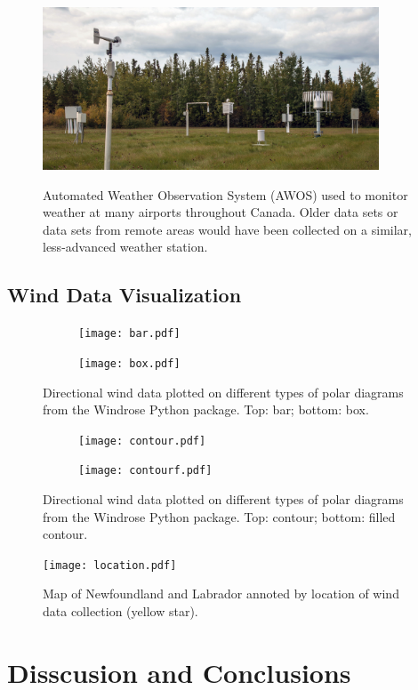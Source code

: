 \documentclass{article}
\begin{document}
\begin{figure}[h!]
\centering
\includegraphics[width=10cm]{Images/AWOS.jpg}
\label{AWOS}
\caption{Automated Weather Observation System (AWOS) used to monitor weather at many airports throughout Canada. Older data sets or data sets from remote areas would have been collected on a similar, 
less-advanced weather station.}
\end{figure}

\subsection{Wind Data Visualization}\label{Wind_data_visualization}

\begin{figure}[h!]
\begin{subfigure}{.55\textwidth}
\centering
\texttt{[image: bar.pdf]}
\label{bar_windrose}
\end{subfigure}
\begin{subfigure}{.55\textwidth}
\centering
\texttt{[image: box.pdf]}
\label{box}
\end{subfigure}
\label{windrose_bar_box}
\caption{Directional wind data plotted on different types of polar diagrams from the Windrose Python package. Top: bar; bottom: box.}
\end{figure}

\begin{figure}[h!]
\begin{subfigure}{.55\textwidth}
\centering
\texttt{[image: contour.pdf]}
\label{contour_windrose}
\end{subfigure}
\begin{subfigure}{.55\textwidth}
\centering
\texttt{[image: contourf.pdf]}
\label{contourf_windrose}
\end{subfigure}
\label{windrose_contours}
\caption{Directional wind data plotted on different types of polar diagrams from the Windrose Python package. Top: contour; bottom: filled contour.}
\end{figure}

\begin{figure}[h!]
\centering
\texttt{[image: location.pdf]}
\label{location}
\caption{Map of Newfoundland and Labrador annoted by location of wind data collection (yellow star).}
\end{figure}

\section{Disscusion and Conclusions}\label{Disscusion_and_conclusions}
\end{document}
